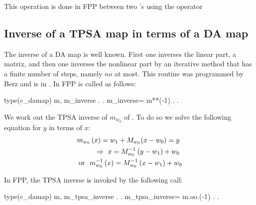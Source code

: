 \documentclass{hitec}     %
\begin{document}
{This operation is done in FPP between two 's using the operator 

\subsection{Inverse of a TPSA map in terms of  a DA map }\label{s:inversetpsa}

The inverse of a DA map is well known. First one inverses the linear part, a matrix, and then one inverses the nonlinear part by an iterative method that has a finite number of steps, namely $no$ at most.  This routine was programmed by Berz and is in .  In FPP is called  as follows:

\begin{code}
type(c_damap) m, m_inverse
       .
       .
m_inverse= m**(-1)
       .
       .
\end{code}

We work out the TPSA inverse of ${m}_{{w}_{0}}$   of . To do so we solve the following equation for $y$ in terms of $x$:
%
%
\begin{align} {m}_{{w}_{0}}\left({x}\right)={w}_{1}+{M}_{{w}_{0}}(x-{w}_{0})=y~\nonumber \\
 \Rightarrow \ x=
{M}_{{w}_{0}}^{-1}\left({y-{w}_{1}}\right)+{w}_{0}~\nonumber \\
~{\rm o}{\rm r}~~{m}_{{w}_{0}}^{-1}\left({x}\right)=
{M}_{{w}_{0}}^{-1}\left({x-{w}_{1}}\right)+{w}_{0}\label{eq:tpsainv} \end{align}


In FPP, the TPSA inverse is invoked by the following call:

\begin{code}
type(c_damap) m, m_tpsa_inverse
       .
       .
m_tpsa_inverse= m.oo.(-1)
       .
       .
\end{code}



}
\end{document}
